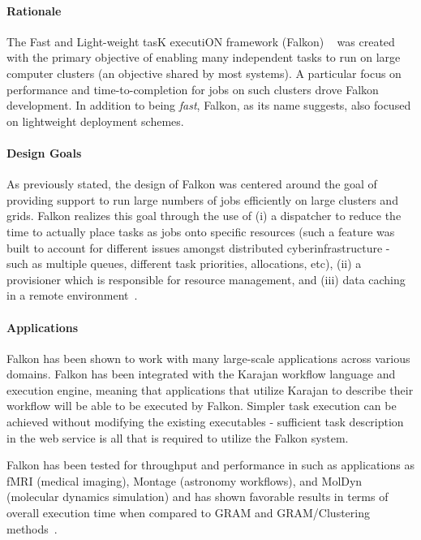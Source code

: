 \documentclass{sig-alternate}
\begin{document}
\paragraph{Rationale}
The Fast and Light-weight tasK executiON framework (Falkon)
~\cite{1362680} was created with the primary objective
of enabling many independent tasks to run on large computer
clusters (an objective shared by most \pilotjob systems). 
A particular focus on performance and time-to-completion for jobs
on such clusters drove Falkon development. In 
addition to being \textit{fast}, Falkon, as its name suggests, 
also focused on lightweight deployment schemes.

\paragraph{Design Goals}
As previously stated, the design of Falkon was centered
around the goal of providing support to run large numbers
of jobs efficiently on large clusters and grids. Falkon
realizes this goal through the use of (i) a 
dispatcher to reduce the time to actually place
tasks as jobs onto specific resources (such a feature
was built to account for different issues amongst
distributed cyberinfrastructure - such as multiple
queues, different task priorities, allocations, etc), 
(ii) a provisioner which is responsible for
resource management, and (iii) data caching in
a remote environment~\cite{1362680}.


\paragraph{Applications}

Falkon has been shown to work with many large-scale
applications across various domains. Falkon 
has been integrated with the Karajan workflow language
and execution engine, meaning that applications
that utilize Karajan to describe their workflow
will be able to be executed by Falkon. Simpler
task execution can be achieved without 
modifying the existing executables - sufficient
task description in the web service is all that 
is required to utilize the Falkon system. 

Falkon has been tested for throughput 
and performance in such as applications
as fMRI (medical imaging), Montage (astronomy workflows),
and MolDyn (molecular dynamics simulation) and has shown
favorable results in terms of overall execution time when compared
to GRAM and GRAM/Clustering methods~\cite{1362680}.
\end{document}
